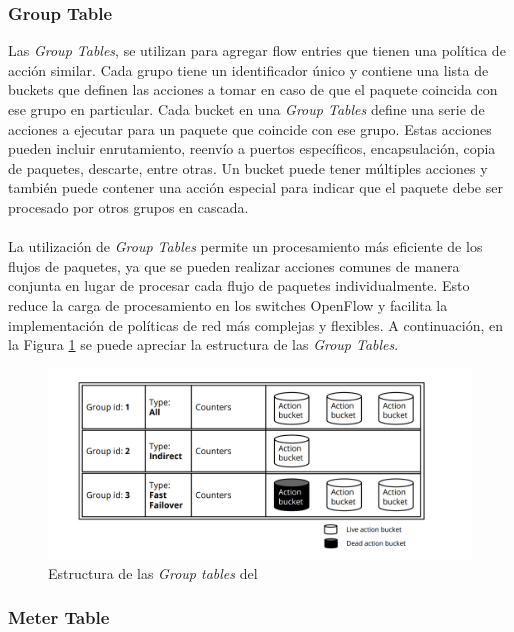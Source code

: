\subsubsection{Group Table}

Las \textit{Group Tables}, se utilizan para agregar flow entries que tienen una política de acción similar. Cada grupo tiene un identificador único y contiene una lista de buckets que definen las acciones a tomar en caso de que el paquete coincida con ese grupo en particular. Cada bucket en una \textit{Group Tables} define una serie de acciones a ejecutar para un paquete que coincide con ese grupo. Estas acciones pueden incluir enrutamiento, reenvío a puertos específicos, encapsulación, copia de paquetes, descarte, entre otras. Un bucket puede tener múltiples acciones y también puede contener una acción especial para indicar que el paquete debe ser procesado por otros grupos en cascada. \\
\\
La utilización de \textit{Group Tables} permite un procesamiento más eficiente de los flujos de paquetes, ya que se pueden realizar acciones comunes de manera conjunta en lugar de procesar cada flujo de paquetes individualmente. Esto reduce la carga de procesamiento en los switches OpenFlow y facilita la implementación de políticas de red más complejas y flexibles. A continuación, en la Figura \ref{fig:bofuss4} se puede apreciar la estructura de las \textit{Group Tables}.

\begin{figure}[ht]
    \centering
    \includegraphics[width=\textwidth]{archivos/img/teoria/bofuss4.png}
    \caption{Estructura de las \textit{Group tables} del  \cite{fernandes2015software}}
    \label{fig:bofuss4}
\end{figure}


\subsubsection{Meter Table}

